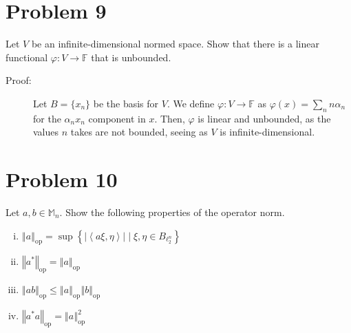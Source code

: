\documentclass[9pt]{extarticle}
\newcommand{\iprod}[2]{\left\langle #1,#2\right\rangle}
\newcommand{\norm}[1]{\left\Vert #1\right\Vert}
\begin{document}
  \section{Problem 9}%
  Let $V$ be an infinite-dimensional normed space. Show that there is a linear functional $\varphi: V\rightarrow \mathbb{F}$ that is unbounded.
  \begin{description}
    \item[Proof:] Let $B = \{x_n\}$ be the basis for $V$. We define $\varphi: V\rightarrow \mathbb{F}$ as $\varphi(x) = \sum_{n} n\alpha_n$ for the $\alpha_nx_n$ component in $x$. Then, $\varphi$ is linear and unbounded, as the values $n$ takes are not bounded, seeing as $V$ is infinite-dimensional.
  \end{description}
  \section{Problem 10}%
  Let $a,b\in \mathbb{M}_{n}$. Show the following properties of the operator norm.
  \begin{enumerate}[(i)]
    \item $\norm{a}_{\text{op}} = \sup\left\{|\iprod{a\xi}{\eta}|\mid \xi,\eta\in B_{\ell_{2}^{n}} \right\}$
    \item $\norm{a^{\ast}}_{\text{op}} = \norm{a}_{\text{op}}$
    \item $\norm{ab}_{\text{op}} \leq \norm{a}_{\text{op}}\norm{b}_{\text{op}}$
    \item $\norm{a^{\ast}a}_{\text{op}} = \norm{a}^{2}_{\text{op}}$
  \end{enumerate}
\end{document}
